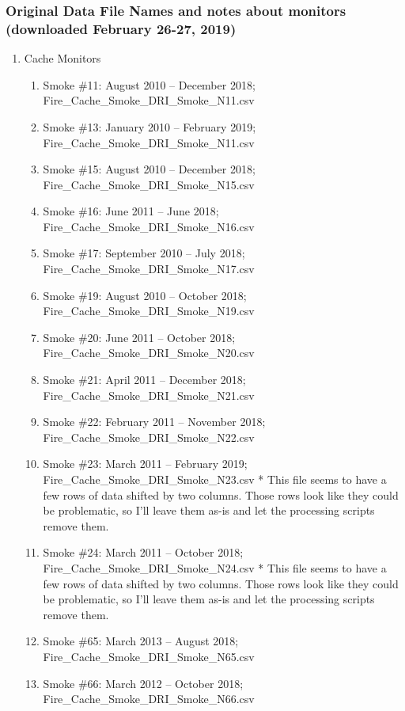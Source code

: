 \subsubsection*{Original Data File Names and notes about monitors (downloaded February 26-27, 2019)}
 \renewcommand{\labelenumii}{\arabic{enumii}}
\begin{enumerate}%
\item Cache Monitors

\begin{enumerate}[nolistsep]
\item Smoke \#11: August 2010 -- December 2018; Fire\_Cache\_Smoke\_DRI\_Smoke\_N11.csv
\item Smoke \#13: January 2010 -- February 2019; Fire\_Cache\_Smoke\_DRI\_Smoke\_N11.csv
\item Smoke \#15: August 2010 -- December 2018; Fire\_Cache\_Smoke\_DRI\_Smoke\_N15.csv
\item Smoke \#16: June 2011 -- June 2018; Fire\_Cache\_Smoke\_DRI\_Smoke\_N16.csv
\item Smoke \#17: September 2010 -- July 2018; Fire\_Cache\_Smoke\_DRI\_Smoke\_N17.csv
\item Smoke \#19: August 2010 -- October 2018; Fire\_Cache\_Smoke\_DRI\_Smoke\_N19.csv
\item Smoke \#20: June 2011 -- October 2018; Fire\_Cache\_Smoke\_DRI\_Smoke\_N20.csv
\item Smoke \#21: April 2011 -- December 2018; Fire\_Cache\_Smoke\_DRI\_Smoke\_N21.csv
\item Smoke \#22: February 2011 -- November 2018; Fire\_Cache\_Smoke\_DRI\_Smoke\_N22.csv
\item Smoke \#23: March 2011 -- February 2019; Fire\_Cache\_Smoke\_DRI\_Smoke\_N23.csv * This file seems to have a few rows of data shifted by two columns. Those rows look like they could be problematic, so I'll leave them as-is and let the processing scripts remove them.
\item Smoke \#24: March 2011 -- October 2018; Fire\_Cache\_Smoke\_DRI\_Smoke\_N24.csv * This file seems to have a few rows of data shifted by two columns. Those rows look like they could be problematic, so I'll leave them as-is and let the processing scripts remove them.
\item Smoke \#65: March 2013 -- August 2018; Fire\_Cache\_Smoke\_DRI\_Smoke\_N65.csv
\item Smoke \#66: March 2012 -- October 2018; Fire\_Cache\_Smoke\_DRI\_Smoke\_N66.csv

\end{enumerate}
\end{enumerate}
